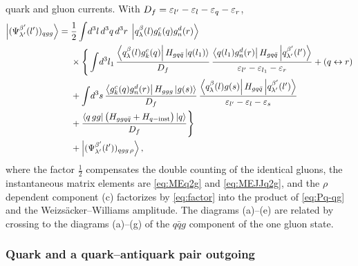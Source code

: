 quark and gluon currents. With $D_{f}=\varepsilon_{l'}-\varepsilon_{l}-\varepsilon_{q}-\varepsilon_{r}$,
\begin{align}
\left|(\Psi^{\beta'}_{\lambda'}(l'))_{qgg}\right\rangle=\;&\frac12\int\!d^{3}l\,d^{3}q\,d^{3}r\;\left|q^{\beta}_{\lambda}(l)g^{c}_{k}(q)g^{d}_{n}(r)\right\rangle
\nonumber\\&\times\Bigg\{\int\!d^{3}l_{1}\,\frac{\left\langle q^{\beta}_{\lambda}(l)g^{c}_{k}(q)\right|H_{gq\bar q}\left|q(l_{1})\right\rangle}{D_{f}}\,
\frac{\left\langle q(l_{1})g^{d}_{n}(r)\right|H_{gq\bar q}\left|q^{\beta'}_{\lambda'}(l')\right\rangle}{\varepsilon_{l'}-\varepsilon_{l_{1}}-\varepsilon_{r}}
+(q\leftrightarrow r)
\nonumber\\
&+\int\!d^{3}s\,\frac{\left\langle g^{c}_{k}(q)g^{d}_{n}(r)\right|H_{ggg}\left|g(s)\right\rangle}{D_{f}}\,
\frac{\left\langle q^{\beta}_{\lambda}(l)g(s)\right|H_{gq\bar q}\left|q^{\beta'}_{\lambda'}(l')\right\rangle}{\varepsilon_{l'}-\varepsilon_{l}-\varepsilon_{s}}
\nonumber\\
&+\frac{\left\langle q\,gg\right|\big(H_{ggq\bar q}+H_{q-{\rm inst}}\big)\left|q\right\rangle}{D_{f}}\Bigg\}
\nonumber\\
&+\left|(\Psi^{\beta'}_{\lambda'}(l'))_{qgg\,\rho}\right\rangle ,
\label{eq:Pq-qgg}
\end{align}
where the factor $\tfrac12$ compensates the double counting of the identical gluons, the
instantaneous matrix elements are \eqref{eq:MEq2g} and \eqref{eq:MEJJq2g}, and the $\rho$ dependent
component (c) factorizes by \eqref{eq:factor} into the product of \eqref{eq:Pq-qg} and the
Weizs\"acker--Williams amplitude. The diagrams (a)--(e) are related by crossing to the diagrams
(a)--(g) of the $q\bar q g$ component of the one gluon state.

\subsubsection{Quark and a quark--antiquark pair outgoing}

